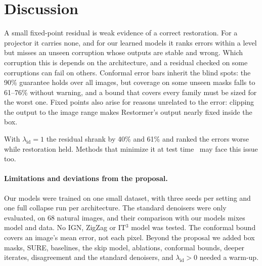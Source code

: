 \documentclass[10pt,twocolumn,a4paper]{article}
\newcommand{\lid}{\lambda_{\mathrm{id}}}
\begin{document}
\section{Discussion}
A small fixed-point residual is weak evidence of a correct restoration. For a projector it carries
none, and for our learned models it ranks errors within a level but misses an unseen corruption
whose outputs are stable and wrong. Which corruption this is depends on the architecture, and a
residual checked on some corruptions can fail on others. Conformal error bars inherit the blind
spots: the 90\% guarantee holds over all images, but coverage on some unseen masks falls to
61--76\% without warning, and a bound that covers every family must be sized for the worst one. Fixed
points also arise for reasons unrelated to the error: clipping the output to the image range makes
Restormer's output nearly fixed inside the box.

With $\lid = 1$ the residual shrank by 40\%
and 61\% and ranked the errors worse while restoration held. Methods that minimize it at test
time~\cite{durasov2025it3} may face this issue too.

\paragraph{Limitations and deviations from the proposal.}
Our models were trained on one small dataset, with three seeds per setting and one full collapse
run per architecture. The standard denoisers were only evaluated, on 68 natural images, and their
comparison with our models mixes model and data. No IGN, ZigZag or IT$^3$ model was tested. The
conformal bound covers an image's mean error, not each pixel. Beyond the
proposal we added box masks, SURE, baselines, the skip model, ablations, conformal bounds,
deeper iterates, disagreement and the standard denoisers, and $\lid > 0$ needed a
warm-up.

\scriptsize
\setlength{\bibsep}{0pt}

\end{document}
